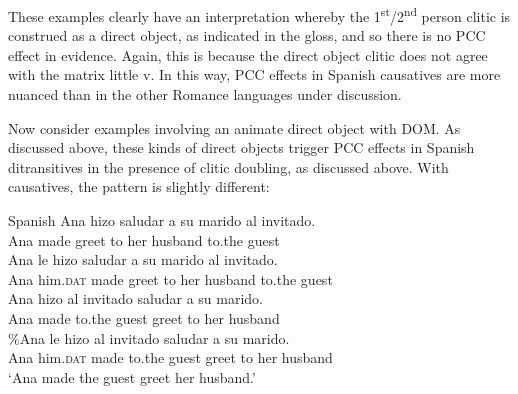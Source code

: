\documentclass[output=paper,colorlinks,citecolor=brown,nonflat]{./langscibook}
\begin{document}
These examples clearly have an interpretation whereby the 1\textsuperscript{st}/2\textsuperscript{nd} person clitic is construed as a direct object, as indicated in the gloss, and so there is no PCC effect in evidence. Again, this is because the direct object clitic does not agree with the matrix little v. In this way, PCC effects in Spanish causatives are more nuanced than in the other Romance languages under discussion. 

Now consider examples involving an animate direct object with DOM. As discussed above, these kinds of direct objects trigger PCC effects in Spanish ditransitives in the presence of clitic doubling, as discussed above. With causatives, the pattern is slightly different:

\ea%
    \label{ex:sheehan:35}
    Spanish
    \ea\label{ex:sheehan:35a}
    \gll    *Ana   hizo   saludar   a   su   marido   al    invitado.\\
            Ana   made   greet   to   her   husband  to.the   guest\\
    \ex\label{ex:sheehan:35b}
    \gll    *Ana   le   hizo   saludar   a   su   marido   al   invitado.\\
            Ana   him.\textsc{dat}   made   greet   to   her husband to.the   guest\\
    \ex\label{ex:sheehan:35c}
    \gll    Ana   hizo     al     invitado   saludar   a   su   marido.\\
            Ana   made   to.the   guest   greet   to   her   husband\\
    \ex\label{ex:sheehan:35d}
    \gll    \%Ana le   hizo   al   invitado saludar   a     su   marido.\\
            Ana   him.\textsc{dat}   made   to.the   guest   greet   to   her   husband\\
    \glt    ‘Ana made the guest greet her husband.’
    \z
\z
\end{document}
